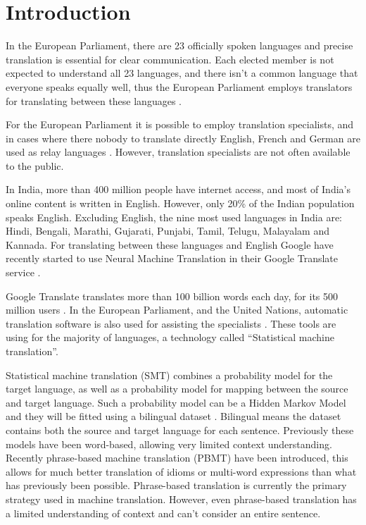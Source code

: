 \chapter{Introduction}

In the European Parliament, there are 23 officially spoken languages and precise translation is essential for clear communication. Each elected member is not expected to understand all 23 languages, and there isn't a common language that everyone speaks equally well, thus the European Parliament employs translators for translating between these languages \cite{europarl-translation}.

For the European Parliament it is possible to employ translation specialists, and in cases where there nobody to translate directly English, French and German are used as relay languages \cite{europarl-translation}. However, translation specialists are not often available to the public.

In India, more than 400 million people have internet access, and most of India’s online content is written in English. However, only 20\% of the Indian population speaks English. Excluding English, the nine most used languages in India are: Hindi, Bengali, Marathi, Gujarati, Punjabi, Tamil, Telugu, Malayalam and Kannada. For translating between these languages and English Google have recently started to use Neural Machine Translation in their Google Translate service \cite{google-translate-india}.

Google Translate translates more than 100 billion words each day, for its 500 million users \cite{google-translate-stats}. In the European Parliament, and the United Nations, automatic translation software is also used for assisting the specialists \cite{europarl-translation}. These tools are using for the majority of languages, a technology called ``Statistical machine translation''.

Statistical machine translation (SMT) combines a probability model for the target language, as well as a probability model for mapping between the source and target language. Such a probability model can be a Hidden Markov Model and they will be fitted using a bilingual dataset \cite{smt-comparetive-study}. Bilingual means the dataset contains both the source and target language for each sentence. Previously these models have been word-based, allowing very limited context understanding. Recently phrase-based machine translation (PBMT) have been introduced, this allows for much better translation of idioms or multi-word expressions than what has previously been possible. Phrase-based translation is currently the primary strategy used in machine translation. However, even phrase-based translation has a limited understanding of context and can't consider an entire sentence.

